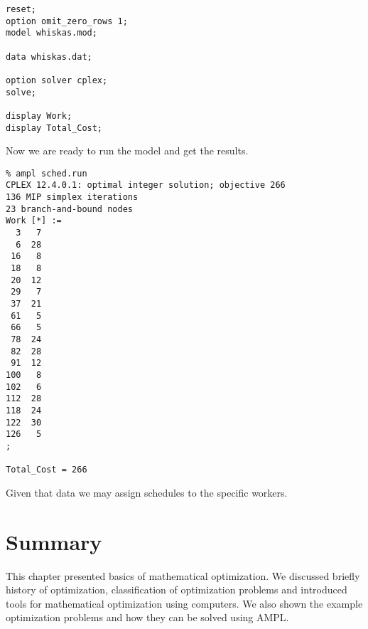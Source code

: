 \begin{lstlisting}
reset;
option omit_zero_rows 1;
model whiskas.mod;

data whiskas.dat;

option solver cplex;
solve;

display Work;
display Total_Cost;
\end{lstlisting}

Now we are ready to run the model and get the results.

\begin{lstlisting}
% ampl sched.run
CPLEX 12.4.0.1: optimal integer solution; objective 266
136 MIP simplex iterations
23 branch-and-bound nodes
Work [*] :=
  3   7
  6  28
 16   8
 18   8
 20  12
 29   7
 37  21
 61   5
 66   5
 78  24
 82  28
 91  12
100   8
102   6
112  28
118  24
122  30
126   5
;

Total_Cost = 266
\end{lstlisting}

Given that data we may assign schedules to the specific workers.

\section{Summary}

This chapter presented basics of mathematical optimization. We discussed briefly history of optimization, classification of optimization problems and introduced tools for mathematical optimization using computers. We also shown the example optimization problems and how they can be solved using AMPL.

